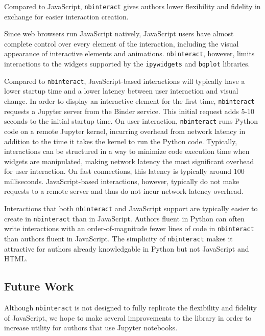 \documentclass[nobib]{tufte-handout}
\newcommand{\code}[1]{\texttt{#1}}
\begin{document}
Compared to JavaScript, \code{nbinteract} gives authors lower flexibility and
fidelity in exchange for easier interaction creation.

Since web browsers run JavaScript natively, JavaScript users have almost
complete control over every element of the interaction, including the visual
appearance of interactive elements and animations. \code{nbinteract}, however,
limits interactions to the widgets supported by the \code{ipywidgets} and
\code{bqplot} libraries.

Compared to \code{nbinteract}, JavaScript-based interactions will typically
have a lower startup time and a lower latency between user interaction and
visual change. In order to display an interactive element for the first time,
\code{nbinteract} requests a Jupyter server from the Binder service. This
initial request adds 5-10 seconds to the initial startup time. On user
interaction, \code{nbinteract} runs Python code on a remote Jupyter kernel,
incurring overhead from network latency in addition to the time it takes the
kernel to run the Python code. Typically, interactions can be structured in a
way to minimize code execution time when widgets are manipulated, making
network latency the most significant overhead for user interaction. On fast
connections, this latency is typically around 100 milliseconds.
JavaScript-based interactions, however, typically do not make requests to a
remote server and thus do not incur network latency overhead.

Interactions that both \code{nbinteract} and JavaScript support are typically
easier to create in \code{nbinteract} than in JavaScript. Authors fluent in
Python can often write interactions with an order-of-magnitude fewer lines of
code in \code{nbinteract} than authors fluent in JavaScript. The simplicity of
\code{nbinteract} makes it attractive for authors already knowledgable in
Python but not JavaScript and HTML.


\subsection{Future Work} %
\label{sub:future_work}

Although \code{nbinteract} is not designed to fully replicate the flexibility
and fidelity of JavaScript, we hope to make several improvements to the library
in order to increase utility for authors that use Jupyter notebooks.
\end{document}
